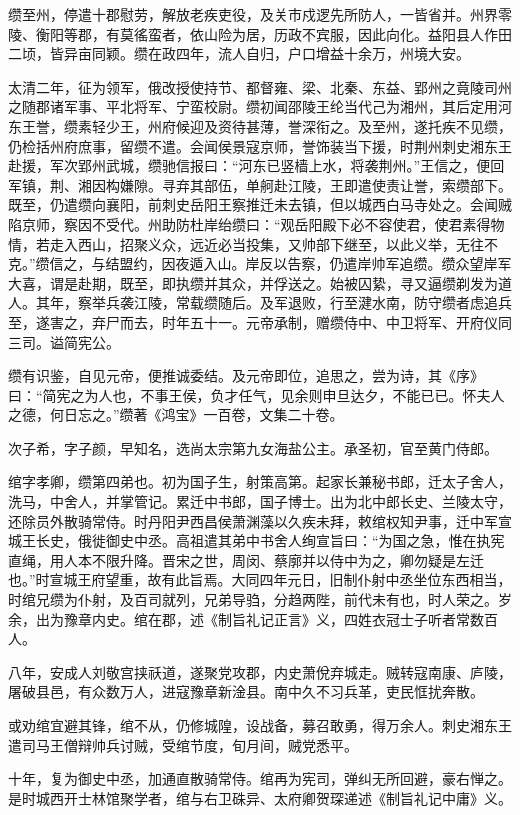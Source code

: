 \documentclass[12pt,UTF8]{ctexbook}
\begin{document}
缵至州，停遣十郡慰劳，解放老疾吏役，及关市戍逻先所防人，一皆省并。州界零陵、衡阳等郡，有莫徭蛮者，依山险为居，历政不宾服，因此向化。益阳县人作田二顷，皆异亩同颖。缵在政四年，流人自归，户口增益十余万，州境大安。

太清二年，征为领军，俄改授使持节、都督雍、梁、北秦、东益、郢州之竟陵司州之随郡诸军事、平北将军、宁蛮校尉。缵初闻邵陵王纶当代己为湘州，其后定用河东王誉，缵素轻少王，州府候迎及资待甚薄，誉深衔之。及至州，遂托疾不见缵，仍检括州府庶事，留缵不遣。会闻侯景寇京师，誉饰装当下援，时荆州刺史湘东王赴援，军次郢州武城，缵驰信报曰：“河东已竖樯上水，将袭荆州。”王信之，便回军镇，荆、湘因构嫌隙。寻弃其部伍，单舸赴江陵，王即遣使责让誉，索缵部下。既至，仍遣缵向襄阳，前刺史岳阳王察推迁未去镇，但以城西白马寺处之。会闻贼陷京师，察因不受代。州助防杜岸绐缵曰：“观岳阳殿下必不容使君，使君素得物情，若走入西山，招聚义众，远近必当投集，又帅部下继至，以此义举，无往不克。”缵信之，与结盟约，因夜遁入山。岸反以告察，仍遣岸帅军追缵。缵众望岸军大喜，谓是赴期，既至，即执缵并其众，并俘送之。始被囚絷，寻又逼缵剃发为道人。其年，察举兵袭江陵，常载缵随后。及军退败，行至湕水南，防守缵者虑追兵至，遂害之，弃尸而去，时年五十一。元帝承制，赠缵侍中、中卫将军、开府仪同三司。谥简宪公。

缵有识鉴，自见元帝，便推诚委结。及元帝即位，追思之，尝为诗，其《序》曰：“简宪之为人也，不事王侯，负才任气，见余则申旦达夕，不能已已。怀夫人之德，何日忘之。”缵著《鸿宝》一百卷，文集二十卷。

次子希，字子颜，早知名，选尚太宗第九女海盐公主。承圣初，官至黄门侍郎。

绾字孝卿，缵第四弟也。初为国子生，射策高第。起家长兼秘书郎，迁太子舍人，洗马，中舍人，并掌管记。累迁中书郎，国子博士。出为北中郎长史、兰陵太守，还除员外散骑常侍。时丹阳尹西昌侯萧渊藻以久疾未拜，敕绾权知尹事，迁中军宣城王长史，俄徙御史中丞。高祖遣其弟中书舍人绚宣旨曰：“为国之急，惟在执宪直绳，用人本不限升降。晋宋之世，周闵、蔡廓并以侍中为之，卿勿疑是左迁也。”时宣城王府望重，故有此旨焉。大同四年元日，旧制仆射中丞坐位东西相当，时绾兄缵为仆射，及百司就列，兄弟导驺，分趋两陛，前代未有也，时人荣之。岁余，出为豫章内史。绾在郡，述《制旨礼记正言》义，四姓衣冠士子听者常数百人。

八年，安成人刘敬宫挟祅道，遂聚党攻郡，内史萧侻弃城走。贼转寇南康、庐陵，屠破县邑，有众数万人，进寇豫章新淦县。南中久不习兵革，吏民恇扰奔散。

或劝绾宜避其锋，绾不从，仍修城隍，设战备，募召敢勇，得万余人。刺史湘东王遣司马王僧辩帅兵讨贼，受绾节度，旬月间，贼党悉平。

十年，复为御史中丞，加通直散骑常侍。绾再为宪司，弹纠无所回避，豪右惮之。是时城西开士林馆聚学者，绾与右卫硃异、太府卿贺琛递述《制旨礼记中庸》义。
\end{document}
